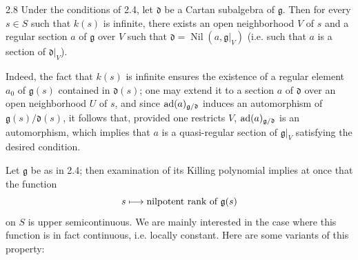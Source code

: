 \begin{corollary}{2.8}\label{XIV.2.8}
Under the conditions of 2.4, let $\mathfrak d$ be a Cartan
subalgebra of $\mathfrak g$. Then for every $s\in S$ such
that $k(s)$ is infinite, there exists an open neighborhood
$V$ of $s$ and a regular section $a$ of $\mathfrak g$ over
$V$ such that $\mathfrak d=\operatorname{Nil}(a,\mathfrak g|_V)$
(i.e. such that $a$ is a section of $\mathfrak d|_V$).
\end{corollary}
Indeed, the fact that $k(s)$ is infinite ensures the existence
of a regular element $a_0$ of $\mathfrak g(s)$ contained
in $\mathfrak d(s)$; one may extend it to a section $a$ of
$\mathfrak d$ over an open neighborhood $U$ of $s$, and
since $\operatorname{ad}(a)_{\mathfrak g/\mathfrak d}$ induces an
automorphism of $\mathfrak g(s)/\mathfrak d(s)$, it follows
that, provided one restricts $V$, $\operatorname{ad}(a)_{\mathfrak g/\mathfrak d}$
is an automorphism, which implies that $a$ is a quasi-regular
section of $\mathfrak g|_V$ satisfying the desired condition.

Let $\mathfrak g$ be as in 2.4; then examination of its
Killing polynomial implies at once that the function
\[
 s\longmapsto\text{nilpotent rank of }\mathfrak g(s)
\]
on $S$ is upper semicontinuous. We are mainly interested
in the case where this function is in fact continuous,
i.e. locally constant. Here are some variants of this property:

